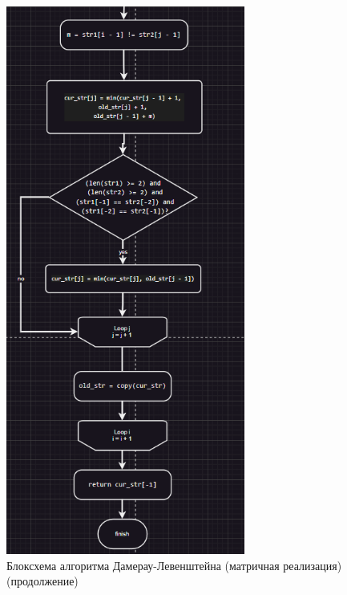 \documentclass[a4paper,12pt]{article}
\begin{document}
\begin{figure}[H]
    \centering
    \includegraphics[width=0.7\textwidth]{block_2_1_2.png}
    \caption{Блоксхема алгоритма Дамерау-Левенштейна (матричная реализация) (продолжение)}
\end{figure}
\end{document}
